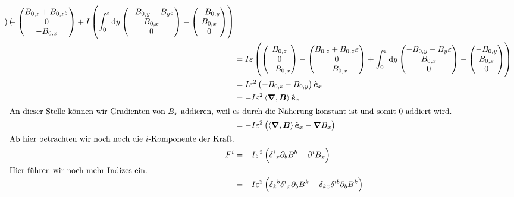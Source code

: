 \documentclass[11pt, ngerman, fleqn]{article}
\newcommand{\divergence}[1]{\inner{\vnabla}{#1}}
\newcommand{\ev}{\hat{\vec e}}
\newcommand{\inner}[2]{\left\langle #1, #2 \right\rangle}
\newcommand{\vnabla}{\vec \nabla}
\renewcommand{\vec}[1]{\boldsymbol{#1}}
\begin{document}
\begin{align*}
{\begin{pmatrix}
	\end{pmatrix}
	-
	\begin{pmatrix}
		B_{0,z} + B_{0,z} \varepsilon \\ 0 \\ - B_{0,x}
	\end{pmatrix}
	}
	+
	I \del{
	\int_0^\varepsilon \dif y
	\begin{pmatrix}
		- B_{0,y} - B_y \varepsilon \\ B_{0,x} \\ 0
	\end{pmatrix}
	-
	\begin{pmatrix}
		- B_{0,y} \\ B_{0,x} \\ 0
	\end{pmatrix}
	} \\
	&=
	I \varepsilon \del{
	\begin{pmatrix}
		B_{0,z} \\ 0 \\ - B_{0,x}
	\end{pmatrix}
	-
	\begin{pmatrix}
		B_{0,z} + B_{0,z} \varepsilon \\ 0 \\ - B_{0,x}
	\end{pmatrix}
	+
	\int_0^\varepsilon \dif y
	\begin{pmatrix}
		- B_{0,y} - B_y \varepsilon \\ B_{0,x} \\ 0
	\end{pmatrix}
	-
	\begin{pmatrix}
		- B_{0,y} \\ B_{0,x} \\ 0
	\end{pmatrix}
	} \\
	&= I \varepsilon^2 \del{-B_{0,z} - B_{0,y}} \ev_x \\
	&= - I \varepsilon^2 \divergence{\vec B} \ev_x \\
	\intertext{An dieser Stelle können wir Gradienten von $B_x$ addieren, weil es durch die Näherung konstant ist und somit 0 addiert wird.}
	&= - I \varepsilon^2 \del{\divergence{\vec B} \ev_x - \vnabla B_x} \\
	\intertext{Ab hier betrachten wir noch noch die $i$-Komponente der Kraft.}
	F^i
	&= - I \varepsilon^2 \del{\delta^i{}_x \partial_b B^b - \partial^i B_x} \\
	\intertext{Hier führen wir noch mehr Indizes ein.}
	&= - I \varepsilon^2 \del{\delta_k{}^b \delta^i{}_x \partial_b B^k - \delta_{kx} \delta^{ib} \partial_b B^k} \\

\end{align*}
\end{document}
